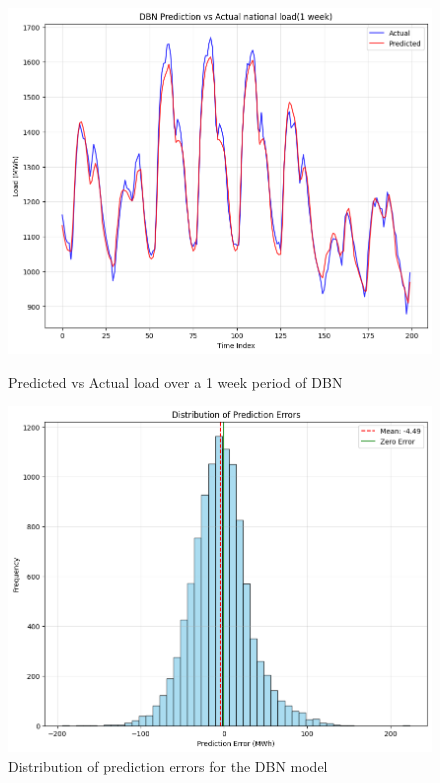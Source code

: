   \begin{figure}[h]
  	\centering
  	\begin{minipage}[b]{0.48\linewidth}
  		\centering
  		\includegraphics[width=\linewidth]{Chapters/images/results/DBN_predicted_vs_actual}
  		\caption{Predicted vs Actual load over a 1 week period of DBN}
  		\label{fig:dbnpredictedvsactual}
  	\end{minipage}
  	\hfill
  	\begin{minipage}[b]{0.48\linewidth}
  		\centering
  		\includegraphics[width=\linewidth]{Chapters/images/results/dbn_error_distribution}
  		\caption{Distribution of prediction errors for the DBN model}
  		\label{fig:dbnerrordistribution}
  	\end{minipage}
  \end{figure}
  

